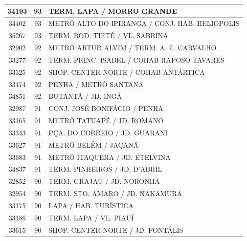 \documentclass[
	12pt,				%
	oneside,			%
	a4paper,			%
	english,			%
	brazil				%
	]{abntex2ppgsi}
\begin{document}
\begin{apendicesenv}
\begin{longtable}{c|c|p{7cm}}
    34193 & 93    & TERM. LAPA / MORRO GRANDE \\
\hline

    34402 & 93    & METRÔ ALTO DO IPIRANGA / CONJ. HAB. HELIÓPOLIS \\
\hline

    35267 & 93    & TERM. ROD. TIETÊ  / VL. SABRINA \\
\hline

    32902 & 92    & METRÔ ARTUR ALVIM / TERM. A. E. CARVALHO \\
\hline

    33277 & 92    & TERM. PRINC. ISABEL / COHAB RAPOSO TAVARES \\
\hline

    33325 & 92    & SHOP. CENTER NORTE / COHAB ANTÁRTICA \\
\hline

    33474 & 92    & PENHA   / METRÔ SANTANA \\
\hline

    34851 & 92    & BUTANTÃ / JD. INGÁ \\
\hline

    32987 & 91    & CONJ. JOSÉ BONIFÁCIO / PENHA \\
\hline

    33165 & 91    & METRÔ TATUAPÉ / JD. ROMANO \\
\hline

    33343 & 91    & PÇA. DO CORREIO / JD. GUARANI \\
\hline

    33627 & 91    & METRÔ BELÉM / JAÇANÃ \\
\hline

    33683 & 91    & METRÔ ITAQUERA / JD. ETELVINA \\
\hline

    34837 & 91    & TERM. PINHEIROS / JD. D'ABRIL \\
\hline

    32852 & 90    & TERM. GRAJAÚ / JD. NORONHA \\
\hline

    32954 & 90    & TERM. STO. AMARO / JD. NAKAMURA \\
\hline

    33175 & 90    & LAPA / HAB. TURÍSTICA \\
\hline

    33186 & 90    & TERM. LAPA / VL. PIAUÍ \\
\hline

    33615 & 90    & SHOP. CENTER NORTE / JD. FONTÁLIS \\
\hline


\end{longtable}
\end{apendicesenv}
\end{document}

